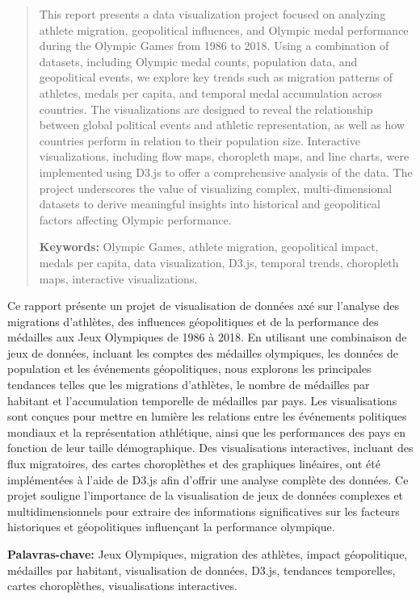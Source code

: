 \begin{abstract}

    This report presents a data visualization project focused on analyzing athlete migration, geopolitical influences, and Olympic medal performance during the Olympic Games from 1986 to 2018. Using a combination of datasets, including Olympic medal counts, population data, and geopolitical events, we explore key trends such as migration patterns of athletes, medals per capita, and temporal medal accumulation across countries. The visualizations are designed to reveal the relationship between global political events and athletic representation, as well as how countries perform in relation to their population size. Interactive visualizations, including flow maps, choropleth maps, and line charts, were implemented using D3.js to offer a comprehensive analysis of the data. The project underscores the value of visualizing complex, multi-dimensional datasets to derive meaningful insights into historical and geopolitical factors affecting Olympic performance.

    \vspace{1\baselineskip}

    \textbf{Keywords:} Olympic Games, athlete migration, geopolitical impact, medals per capita, data visualization, D3.js, temporal trends, choropleth maps, interactive visualizations.

\end{abstract}


\begin{summary}

    Ce rapport présente un projet de visualisation de données axé sur l'analyse des migrations d'athlètes, des influences géopolitiques et de la performance des médailles aux Jeux Olympiques de 1986 à 2018. En utilisant une combinaison de jeux de données, incluant les comptes des médailles olympiques, les données de population et les événements géopolitiques, nous explorons les principales tendances telles que les migrations d'athlètes, le nombre de médailles par habitant et l'accumulation temporelle de médailles par pays. Les visualisations sont conçues pour mettre en lumière les relations entre les événements politiques mondiaux et la représentation athlétique, ainsi que les performances des pays en fonction de leur taille démographique. Des visualisations interactives, incluant des flux migratoires, des cartes choroplèthes et des graphiques linéaires, ont été implémentées à l'aide de D3.js afin d'offrir une analyse complète des données. Ce projet souligne l'importance de la visualisation de jeux de données complexes et multidimensionnels pour extraire des informations significatives sur les facteurs historiques et géopolitiques influençant la performance olympique.



    \vspace{1\baselineskip}

    \textbf{Palavras-chave:} Jeux Olympiques, migration des athlètes, impact géopolitique, médailles par habitant, visualisation de données, D3.js, tendances temporelles, cartes choroplèthes, visualisations interactives.

\end{summary}


